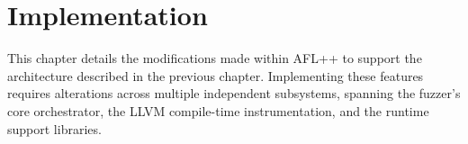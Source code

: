 \chapter{Implementation}
\label{ch:impl}

This chapter details the modifications made within AFL++ to support the architecture described in the previous chapter. Implementing these features requires alterations across multiple independent subsystems, spanning the fuzzer's core orchestrator, the LLVM compile-time instrumentation, and the runtime support libraries.











